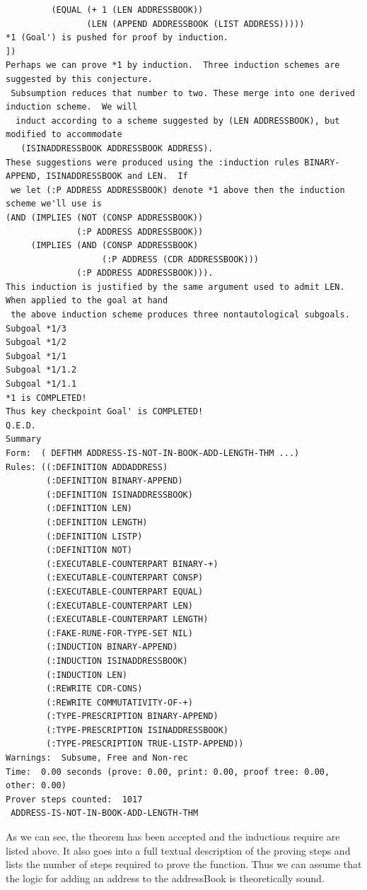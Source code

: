 \documentclass[11pt, letterpaper]{report}
\begin{document}
\begin{description}
{\begin{verbatim}
         (EQUAL (+ 1 (LEN ADDRESSBOOK))
                (LEN (APPEND ADDRESSBOOK (LIST ADDRESS)))))
*1 (Goal') is pushed for proof by induction.
])
Perhaps we can prove *1 by induction.  Three induction schemes are suggested by this conjecture. 
 Subsumption reduces that number to two. These merge into one derived induction scheme.  We will
  induct according to a scheme suggested by (LEN ADDRESSBOOK), but modified to accommodate
   (ISINADDRESSBOOK ADDRESSBOOK ADDRESS).
These suggestions were produced using the :induction rules BINARY-APPEND, ISINADDRESSBOOK and LEN.  If
 we let (:P ADDRESS ADDRESSBOOK) denote *1 above then the induction scheme we'll use is
(AND (IMPLIES (NOT (CONSP ADDRESSBOOK))
              (:P ADDRESS ADDRESSBOOK))
     (IMPLIES (AND (CONSP ADDRESSBOOK)
                   (:P ADDRESS (CDR ADDRESSBOOK)))
              (:P ADDRESS ADDRESSBOOK))).
This induction is justified by the same argument used to admit LEN.  When applied to the goal at hand
 the above induction scheme produces three nontautological subgoals.
Subgoal *1/3
Subgoal *1/2
Subgoal *1/1
Subgoal *1/1.2
Subgoal *1/1.1
*1 is COMPLETED!
Thus key checkpoint Goal' is COMPLETED!
Q.E.D.
Summary
Form:  ( DEFTHM ADDRESS-IS-NOT-IN-BOOK-ADD-LENGTH-THM ...)
Rules: ((:DEFINITION ADDADDRESS)
        (:DEFINITION BINARY-APPEND)
        (:DEFINITION ISINADDRESSBOOK)
        (:DEFINITION LEN)
        (:DEFINITION LENGTH)
        (:DEFINITION LISTP)
        (:DEFINITION NOT)
        (:EXECUTABLE-COUNTERPART BINARY-+)
        (:EXECUTABLE-COUNTERPART CONSP)
        (:EXECUTABLE-COUNTERPART EQUAL)
        (:EXECUTABLE-COUNTERPART LEN)
        (:EXECUTABLE-COUNTERPART LENGTH)
        (:FAKE-RUNE-FOR-TYPE-SET NIL)
        (:INDUCTION BINARY-APPEND)
        (:INDUCTION ISINADDRESSBOOK)
        (:INDUCTION LEN)
        (:REWRITE CDR-CONS)
        (:REWRITE COMMUTATIVITY-OF-+)
        (:TYPE-PRESCRIPTION BINARY-APPEND)
        (:TYPE-PRESCRIPTION ISINADDRESSBOOK)
        (:TYPE-PRESCRIPTION TRUE-LISTP-APPEND))
Warnings:  Subsume, Free and Non-rec
Time:  0.00 seconds (prove: 0.00, print: 0.00, proof tree: 0.00, other: 0.00)
Prover steps counted:  1017
 ADDRESS-IS-NOT-IN-BOOK-ADD-LENGTH-THM
\end{verbatim}}
\normalsize
As we can see, the theorem has been accepted and the inductions require are listed above.  It also goes into a full textual description of the proving steps and lists the number of steps required to prove the function.  Thus we can assume that the logic for adding an address to the addressBook is theoretically sound.\\\\

\end{description}
\end{document}
